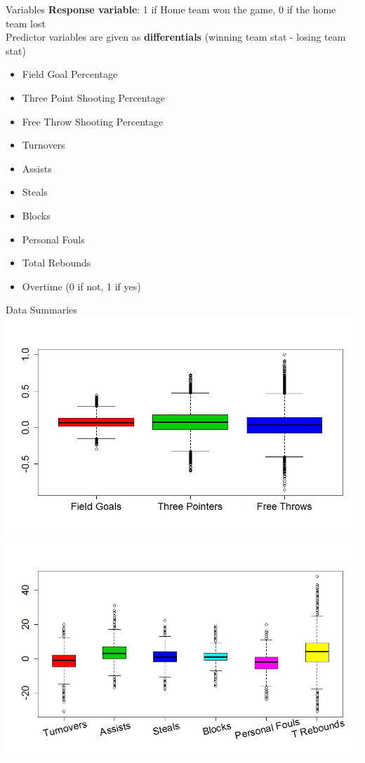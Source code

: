 \documentclass{beamer}
\begin{document}
\begin{frame}{Variables}
\textbf{Response variable}: 1 if Home team won the game, 0 if the home team lost\\
Predictor variables are given as \textbf{differentials} (winning team stat - losing team stat) 

	\begin{multicols}{2}
		
	\begin{itemize}
		\item Field Goal Percentage
		\item Three Point Shooting Percentage
		\item Free Throw Shooting Percentage
		\item Turnovers
		\item Assists
		\item Steals
		\item Blocks
		\item Personal Fouls
		\item Total Rebounds
		\item Overtime (0 if not, 1 if yes)
	\end{itemize}
	
\end{multicols}


\end{frame}

\begin{frame}{Data Summaries}
	\centering
	\includegraphics[height=.45\textheight]{percentbox.jpeg}\\
	\vspace{-10pt}
	\includegraphics[height=.5\textheight]{diffbox.jpeg}
\end{frame}
\end{document}
